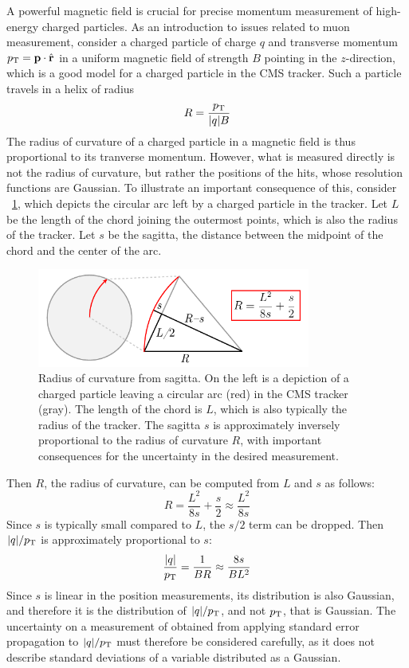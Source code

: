 A powerful magnetic field is crucial for precise momentum measurement of high-energy charged particles.
As an introduction to issues related to muon \pT measurement, consider a charged particle of charge $q$ and transverse momentum $p_{\mathrm{T}} = \mathbf{p} \cdot \hat{\mathbf{r}}$ in a uniform magnetic field of strength $B$ pointing in the $z$-direction, which is a good model for a charged particle in the CMS tracker. Such a particle travels in a helix of radius
\begin{equation}
  R = \frac{p_{\mathrm{T}}}{|q|B}
  \label{cms:radius}
\end{equation}
The radius of curvature of a charged particle in a magnetic field is thus proportional to its tranverse momentum.
However, what is measured directly is not the radius of curvature, but rather the positions of the hits, whose resolution functions are Gaussian.
To illustrate an important consequence of this, consider \Fig~\ref{cms:sagitta}, which depicts the circular arc left by a charged particle in the tracker.
Let $L$ be the length of the chord joining the outermost points, which is also the radius of the tracker.
Let $s$ be the sagitta, \ie the distance between the midpoint of the chord and the center of the arc.
\begin{figure}[tpb]
  \centering
  \includegraphics[width=0.8\textwidth]{figures/cms/Sagitta.pdf}
  \caption[Radius of curvature from sagitta.]{Radius of curvature from sagitta. On the left is a depiction of a charged particle leaving a circular arc (red) in the CMS tracker (gray). The length of the chord is $L$, which is also typically the radius of the tracker. The sagitta $s$ is approximately inversely proportional to the radius of curvature $R$, with important consequences for the uncertainty in the desired \pT measurement.}
  \label{cms:sagitta}
\end{figure}
Then $R$, the radius of curvature, can be computed from $L$ and $s$ as follows:
\begin{equation}
  R = \frac{L^2}{8s} + \frac{s}{2} \approx \frac{L^2}{8s}
  \label{cms:eqn_sagitta}
\end{equation}
Since $s$ is typically small compared to $L$, the $s/2$ term can be dropped.
Then $|q|/p_{\mathrm{T}}$ is approximately proportional to $s$:
\begin{align}
  \frac{|q|}{p_{\mathrm{T}}} = \frac{1}{BR} \approx \frac{8s}{BL^2}
  \label{cms:pTError}
\end{align}
Since $s$ is linear in the position measurements, its distribution is also Gaussian, and therefore it is the distribution of $|q|/p_{\mathrm{T}}$, and not $p_{\mathrm{T}}$, that is Gaussian.
The uncertainty on a measurement of \pT obtained from applying standard error propagation to $|q|/p_{\mathrm{T}}$ must therefore be considered carefully, as it does not describe standard deviations of a variable distributed as a Gaussian.

